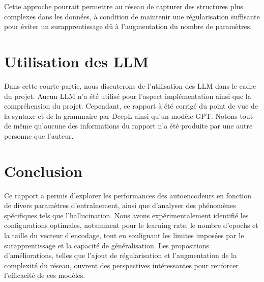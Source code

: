 \documentclass{article}
\begin{document}
\noindent Cette approche pourrait permettre au réseau de capturer des structures plus complexes dans les données, à condition de maintenir une régularisation suffisante pour éviter un surapprentissage dû à l’augmentation du nombre de paramètres. \\

\section{Utilisation des LLM}

\noindent Dans cette courte partie, nous discuterons de l'utilisation des LLM dans le cadre du projet. Aucun LLM n'a été utilisé pour l'aspect implémentation ainsi que la compréhension du projet. Cependant, ce rapport à été corrigé du point de vue de la syntaxe et de la grammaire par DeepL ainsi qu'un modèle GPT. Notons tout de même qu'aucune des informations du rapport n'a été produite par une autre personne que l'auteur.

\section{Conclusion}

\noindent Ce rapport a permis d'explorer les performances des autoencodeurs en fonction de divers paramètres d'entraînement, ainsi que d'analyser des phénomènes spécifiques tels que l'hallucination. Nous avons expérimentalement identifié les configurations optimales, notamment pour le learning rate, le nombre d'epochs et la taille du vecteur d'encodage, tout en soulignant les limites imposées par le surapprentissage et la capacité de généralisation. Les propositions d'améliorations, telles que l'ajout de régularisation et l'augmentation de la complexité du réseau, ouvrent des perspectives intéressantes pour renforcer l'efficacité de ces modèles.
\end{document}
